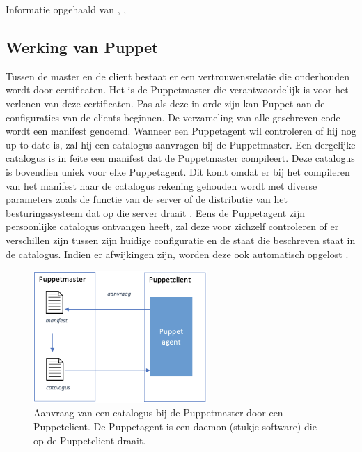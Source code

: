  Informatie opgehaald van \textcite{languagePuppet}, \textcite{masterproef}, \textcite{ansibledoc}



\subsection{Werking van Puppet}

Tussen de master en de client bestaat er een vertrouwensrelatie die onderhouden wordt door certificaten. Het is de Puppetmaster die verantwoordelijk is voor het verlenen van deze certificaten. Pas als deze in orde zijn kan Puppet  aan de configuraties van de clients beginnen. De verzameling van alle geschreven code wordt een manifest genoemd. Wanneer een Puppetagent wil controleren of hij nog up-to-date is, zal hij een catalogus aanvragen bij de Puppetmaster. Een dergelijke catalogus is in feite een manifest dat de Puppetmaster compileert. Deze catalogus is bovendien uniek voor elke Puppetagent. Dit komt omdat er bij het compileren van het manifest naar de catalogus rekening gehouden wordt met diverse parameters zoals de functie van de server of de distributie van het besturingssysteem dat op die server draait \autocite{Puppetlanguagecatalog}. Eens de Puppetagent zijn persoonlijke catalogus ontvangen heeft, zal deze voor zichzelf controleren of er verschillen zijn tussen zijn huidige configuratie en de staat die beschreven staat in de catalogus. Indien er afwijkingen zijn, worden deze ook automatisch opgelost \autocite{puppetdoc}.

\begin{figure}  \begin{center}
  \includegraphics[width=250px]{img/aanvraagCatalogus.png}
 \end{center}\caption{Aanvraag van een catalogus bij de Puppetmaster door een Puppetclient. De Puppetagent is een daemon (stukje software) die op de Puppetclient draait.}  
  \label{fig:aanvraagCatalogus}
\end{figure}


